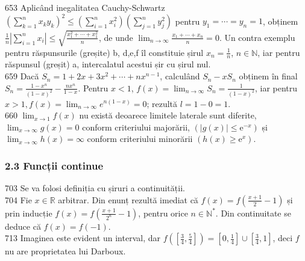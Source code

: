 \documentclass[11pt]{article}
\begin{document}
653 Aplicând inegalitatea Cauchy-Schwartz $\left(\sum_{k=1}^{n} x_{k} y_{k}\right)^{2} \leq\left(\sum_{i=1}^{n} x_{i}^{2}\right)\left(\sum_{j=1}^{n} y_{j}^{2}\right)$ pentru $y_{1}=\cdots=y_{n}=1$, obținem $\frac{1}{n}\left|\sum_{i=1}^{n} x_{i}\right| \leq \sqrt{\frac{x_{1}^{2}+\cdots+x_{1}^{2}}{n}}$, de unde $\lim _{n \rightarrow \infty} \frac{x_{1}+\cdots+x_{n}}{n}=0$. Un contra exemplu pentru răspunsurile (greșite) b, d,e,f îl constituie șirul $x_{n}=\frac{1}{n}$, $n \in \mathbb{N}$, iar pentru răspunsul (greșit) a, intercalatul acestui șir cu șirul nul.\\
659 Dacă $S_{n}=1+2 x+3 x^{2}+\cdots+n x^{n-1}$, calculând $S_{n}-x S_{n}$ obținem în final $S_{n}=\frac{1-x^{n}}{(1-x)^{2}}-\frac{n x^{n}}{1-x}$. Pentru $x<1$, $f(x)=\lim _{n \rightarrow \infty} S_{n}=\frac{1}{(1-x)^{2}}$, iar pentru $x>1, f(x)=\lim _{n \rightarrow \infty} e^{n(1-x)}=0$; rezultă $l=1-0=1$.\\
660 $\lim _{x \rightarrow 1} f(x)$ nu există deoarece limitele laterale sunt diferite, $\lim _{x \rightarrow \infty} g(x)=0$ conform criteriului majorării, $\left(|g(x)| \leq \mathrm{e}^{-x}\right)$ și $\lim _{x \rightarrow \infty} h(x)=\infty$ conform criteriului minorării $\left(h(x) \geq \mathrm{e}^{x}\right)$.\\

\subsubsection*{2.3 Funcții continue}
703 Se va folosi definiția cu șiruri a continuității.\\
704 Fie $x \in \mathbb{R}$ arbitrar. Din enunț rezultă imediat că $f(x)=f\left(\frac{x+1}{2}-1\right)$ și prin inducție $f(x)=f\left(\frac{x+1}{2^{n}}-1\right)$, pentru orice $n \in \mathbb{N}^{*}$. Din continuitate se deduce că $f(x)=f(-1)$.\\
713 Imaginea este evident un interval, dar $f\left(\left[\frac{3}{4}, \frac{5}{4}\right]\right)=\left[0, \frac{1}{4}\right] \cup\left[\frac{3}{4}, 1\right]$, deci $f$ nu are proprietatea lui Darboux.\\
\end{document}
